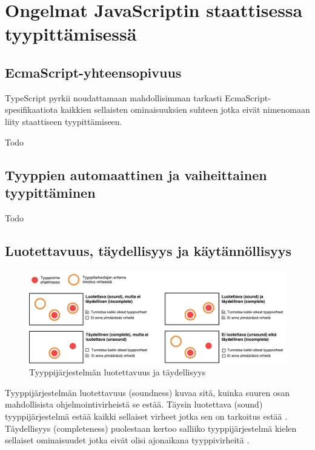 \chapter{Ongelmat JavaScriptin staattisessa tyypittämisessä}

\section{EcmaScript-yhteensopivuus}

TypeScript pyrkii noudattamaan mahdollisimman 
tarkasti EcmaScript-spesifikaatiota kaikkien sellaisten
ominaisuuksien suhteen jotka
eivät nimenomaan liity staattiseen tyypittämiseen. 

Todo

\section{Tyyppien automaattinen ja vaiheittainen tyypittäminen}

Todo

\section{Luotettavuus, täydellisyys ja käytännöllisyys}

\begin{figure}
\includegraphics[width=\textwidth]{images/soundness_completeness2.pdf}
\caption{Tyyppijärjestelmän luotettavuus ja täydellisyys}
\end{figure}

Tyyppijärjestelmän luotettavuus (soundness) kuvaa sitä, kuinka suuren osan
mahdollisista ohjelmointivirheistä se estää. Täysin luotettava (sound)
tyyppijärjestelmä estää kaikki sellaiset virheet jotka sen on tarkoitus
estää \cite{CSE_ProgrammingLanguages}. Täydellisyys (completeness)
puolestaan kertoo salliiko tyyppijärjestelmä kielen sellaiset ominaisuudet
jotka eivät olisi ajonaikana tyyppivirheitä \cite{TypesAndProgrammingLanguages, CSE_ProgrammingLanguages}.

